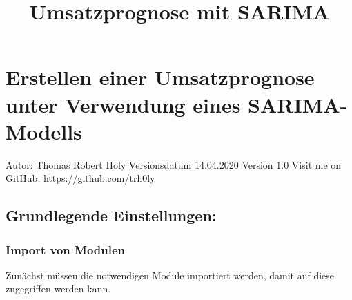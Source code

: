 \documentclass[paper=landscape]{scrartcl}
\title{Umsatzprognose mit SARIMA}
\begin{document}
    
    \maketitle
    
    

    
    \hypertarget{erstellen-einer-umsatzprognose-unter-verwendung-eines-sarima-modells}{%
\section{Erstellen einer Umsatzprognose unter Verwendung eines
SARIMA-Modells}\label{erstellen-einer-umsatzprognose-unter-verwendung-eines-sarima-modells}}

Autor: Thomas Robert Holy Versionsdatum 14.04.2020 Version 1.0 Visit me
on GitHub: https://github.com/trh0ly

\hypertarget{grundlegende-einstellungen}{%
\subsection{Grundlegende
Einstellungen:}\label{grundlegende-einstellungen}}

\hypertarget{import-von-modulen}{%
\subsubsection{Import von Modulen}\label{import-von-modulen}}

Zunächst müssen die notwendigen Module importiert werden, damit auf
diese zugegriffen werden kann.
\end{document}
